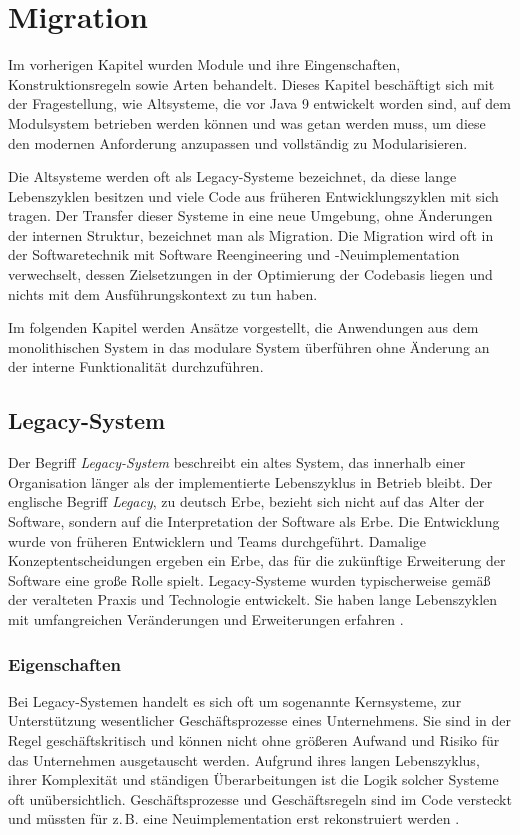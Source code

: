
\newpage \chapter{Migration}
Im vorherigen Kapitel wurden Module und ihre Eingenschaften, Konstruktionsregeln sowie Arten behandelt. 
Dieses Kapitel beschäftigt sich mit der Fragestellung, wie Altsysteme, die vor Java 9 entwickelt worden sind, auf dem Modulsystem betrieben werden können und was getan werden muss, um diese den modernen Anforderung anzupassen und vollständig zu Modularisieren.\bigbreak

Die Altsysteme werden oft als Legacy-Systeme bezeichnet, da diese lange Lebenszyklen besitzen und viele Code aus früheren Entwicklungszyklen mit sich tragen. Der Transfer dieser Systeme in eine neue Umgebung, ohne Änderungen der internen Struktur, bezeichnet man als Migration. 
Die Migration wird oft in der Softwaretechnik mit Software Reengineering und -Neuimplementation verwechselt, dessen Zielsetzungen in der Optimierung der Codebasis liegen und nichts mit dem Ausführungskontext zu tun haben. \bigbreak

Im folgenden Kapitel werden Ansätze vorgestellt, die Anwendungen aus dem monolithischen System in das modulare System überführen ohne Änderung an der interne Funktionalität durchzuführen. 


\section{Legacy-System}
Der Begriff \textit{Legacy-System} beschreibt ein altes System, das innerhalb einer Organisation länger als der implementierte Lebenszyklus in Betrieb bleibt. Der englische Begriff \textit{Legacy}, zu deutsch Erbe, bezieht sich nicht auf das Alter der Software, sondern auf die Interpretation der Software als Erbe. Die Entwicklung wurde von früheren Entwicklern und Teams durchgeführt. Damalige Konzeptentscheidungen ergeben ein Erbe, das für die zukünftige Erweiterung der Software eine große Rolle spielt. Legacy-Systeme wurden typischerweise gemäß der veralteten Praxis und Technologie entwickelt. Sie haben lange Lebenszyklen mit umfangreichen Veränderungen und Erweiterungen erfahren \cite{sneed2016softwaremigration}.

\subsection{Eigenschaften}
Bei Legacy-Systemen handelt es sich oft um sogenannte Kernsysteme, zur Unterstützung wesentlicher Geschäftsprozesse eines Unternehmens. Sie sind in der Regel geschäftskritisch und können nicht ohne größeren Aufwand und Risiko für das Unternehmen ausgetauscht werden. Aufgrund ihres langen Lebenszyklus, ihrer Komplexität und ständigen Überarbeitungen ist die Logik solcher Systeme oft unübersichtlich. Geschäftsprozesse und Geschäftsregeln sind im Code versteckt und müssten für z.\,B. eine Neuimplementation erst rekonstruiert werden \cite{martens2016ablosung}.

